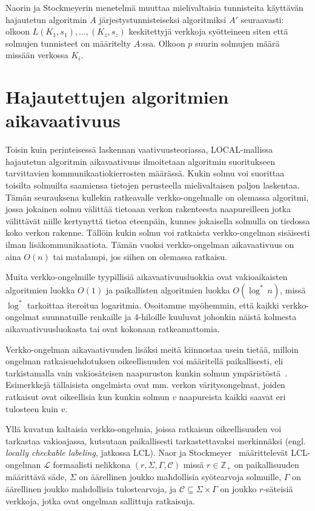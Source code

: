 \documentclass[12pt,finnish]{tktltiki2}
\theoremstyle{definition}
\theoremstyle{remark}
\begin{document}

Naorin ja Stockmeyerin menetelmä muuttaa mielivaltaisia tunnisteita käyttävän hajautetun algoritmin $A$ järjestystunnisteiseksi algoritmiksi $A'$ seuraavasti: olkoon $L(K_1, s_1), ... , (K_z,s_z)$ keskitettyjä verkkoja syötteineen siten että solmujen tunnisteet on määritelty $A$:ssa. Olkoon $p$ suurin solmujen määrä missään verkossa $K_i$.

\section{Hajautettujen algoritmien aikavaativuus}
Toisin kuin perinteisessä laskennan vaativuusteoriassa, LOCAL-mallissa hajautetun algoritmin aikavaativuus ilmoitetaan algoritmin suoritukseen tarvittavien kommunikaatiokierrosten määrässä. Kukin solmu voi suorittaa toisilta solmuilta saamiensa tietojen perusteella mielivaltaisen paljon laskentaa. Tämän seurauksena kullekin ratkeavalle verkko-ongelmalle on olemassa algoritmi, jossa jokainen solmu välittää tietoaan verkon rakenteesta naapureilleen jotka välittävät niille kertynyttä tietoa eteenpäin, kunnes jokaisella solmulla on tiedossa koko verkon rakenne. Tällöin kukin solmu voi ratkaista verkko-ongelman sisäisesti ilman lisäkommunikaatiota. Tämän vuoksi verkko-ongelman aikavaativuus on aina $O(n)$ tai matalampi, jos siihen on olemassa ratkaisu.

Muita verkko-ongelmille tyypillisiä aikavaativuusluokkia ovat vakioaikaisten algoritmien luokka $O(1)$ ja paikallisten algoritmien luokka $O(\log^*\ n)$, missä $\log^*$ tarkoittaa iteroitua logaritmia. Osoitamme myöhemmin, että kaikki verkko-ongelmat suunnatuille renkaille ja 4-hiloille kuuluvat johonkin näistä kolmesta aikavaativuusluokasta tai ovat kokonaan ratkeamattomia.

Verkko-ongelman aikavaativuuden lisäksi meitä kiinnostaa usein tietää, milloin ongelman ratkaisuehdotuksen oikeellisuuden voi määritellä paikallisesti, eli tarkistamalla vain vakiosäteisen naapuruston kunkin solmun ympäristöstä~\cite{linial92}. Esimerkkejä tällaisista ongelmista ovat mm. verkon väritysongelmat, joiden ratkaisut ovat oikeellisia kun kunkin solmun $v$ naapureista kaikki saavat eri tulosteen kuin $v$.

Yllä kuvatun kaltaisia verkko-ongelmia, joissa ratkaisun oikeellisuuden voi tarkastaa vakioajassa, kutsutaan paikallisesti tarkastettavaksi merkinnäksi (engl. \textit{locally checkable labeling}, jatkossa LCL). Naor ja Stockmeyer~\cite{naor95} määrittelevät LCL-ongelman $\mathcal{L}$ formaalisti nelikkona $(r, \Sigma, \Gamma, \mathcal{C})$ missä $r \in \mathbb{Z}_+$ on paikallisuuden määrittävä säde, $\Sigma$ on äärellinen joukko mahdollisia syötearvoja solmuille, $\Gamma$ on äärellinen joukko mahdollisia tulostearvoja, ja $\mathcal{C} \subseteq \Sigma \times \Gamma$ on joukko $r$-säteisiä verkkoja, jotka ovat ongelman sallittuja ratkaisuja.
\end{document}
